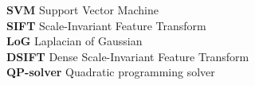 \begin{acronym}
    \textbf{SVM} Support Vector Machine\\
    \textbf{SIFT} Scale-Invariant Feature Transform\\
    \textbf{LoG} Laplacian of Gaussian\\
    \textbf{DSIFT} Dense Scale-Invariant Feature Transform\\
    \textbf{QP-solver} Quadratic programming solver\\
\end{acronym}